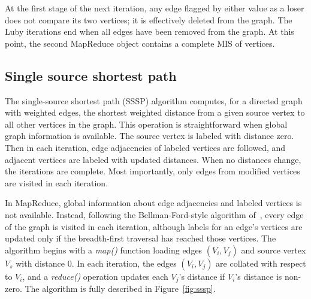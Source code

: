 At the first stage of the next iteration, any edge flagged by either
value as a loser does not compare its two vertices; it is effectively
deleted from the graph.  The Luby iterations end when all edges have
been removed from the graph.  At this point, the second MapReduce
object contains a complete MIS of vertices.

\subsection{Single source shortest path}

The single-source shortest path (SSSP) algorithm computes, for a directed graph
with weighted edges,
the shortest weighted distance from a given source vertex to
all other vertices in the graph.  This operation is straightforward
when global graph information is available.  The source vertex is labeled with
distance zero.  Then in each iteration, edge adjacencies of labeled vertices
are followed, and adjacent vertices are labeled with updated distances.  When
no distances change, the iterations are complete.  Most importantly, only
edges from modified vertices are visited in each iteration.

In MapReduce, global information about edge adjacencies and labeled vertices
is not available.  Instead, following the Bellman-Ford-style 
algorithm of~\cite{SSSPMapReduce, BellmanFord},
every edge of the graph is visited in each iteration,
although labels for an edge's vertices are updated only if the breadth-first
traversal has reached those vertices.  The algorithm begins with a {\it map()}
function loading edges $(V_i, V_j)$ and source vertex $V_s$ with distance 0.
In each iteration, the edges $(V_i, V_j)$ are collated with respect to
$V_i$, and a {\it reduce()} operation updates each $V_j$'s distance if
$V_i$'s distance is non-zero.  The algorithm is fully described in
Figure~\ref{fig:sssp}.


